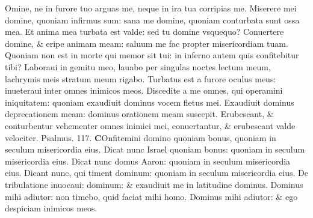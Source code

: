 \documentclass[a5paper,10pt]{book}
\begin{document}
\begin{multicols*}{2}
Omine, ne in furore tuo arguas me, neque in ira tua corripias me.
\newline \color{red} M\color{black}iserere mei domine, quoniam infirmus sum: sana me domine, quoniam conturbata sunt ossa mea.
\newline \color{red} E\color{black}t anima mea turbata est valde: sed tu domine vsquequo?
\newline \color{red} C\color{black}onuertere domine, \& eripe animam meam: saluum me fac propter misericordiam tuam.
\newline \color{red} Q\color{black}uoniam non est in morte qui memor sit tui: in inferno autem quis confitebitur tibi?
\newline \color{red} L\color{black}aboraui in gemitu meo, lauabo per singulas noctes lectum meum, lachrymis meis stratum meum rigabo.
\newline \color{red} T\color{black}urbatus est a furore oculus meus: inueteraui inter omnes inimicos meos.
\newline \color{red} D\color{black}iscedite a me omnes, qui operamini iniquitatem: quoniam exaudiuit dominus vocem fletus mei.
\newline \color{red} E\color{black}xaudiuit dominus deprecationem meam: dominus orationem meam suscepit.
\newline \color{red} E\color{black}rubescant, \& conturbentur vehementer omnes inimici mei, conuertantur, \& erubescant valde velociter.
\newline \color{red} Psalmus. \hypertarget{ps117}{117.} \color{black}
\lettrine[lines=2]{\bfseries \color{red} C}{}Onfitemini domino quoniam bonus, quoniam in seculum misericordia eius.
\newline \color{red} D\color{black}icat nunc Israel quoniam bonus: quoniam in seculum misericordia eius.
\newline \color{red} D\color{black}icat nunc domus Aaron: quoniam in seculum misericordia eius.
\newline \color{red} D\color{black}icant nunc, qui timent dominum: quoniam in seculum misericordia eius.
\newline \color{red} D\color{black}e tribulatione inuocaui: dominum: \& exaudiuit me in latitudine dominus.
\newline \color{red} D\color{black}ominus mihi adiutor: non timebo, quid faciat mihi homo.
\newline \color{red} D\color{black}ominus mihi adiutor: \& ego despiciam inimicos meos.

\end{multicols*}
\end{document}
